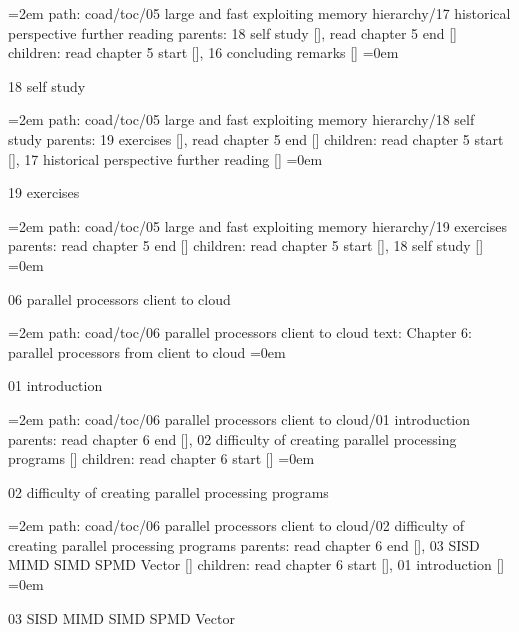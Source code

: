 \leftskip=2em
path: coad/toc/05 large and fast exploiting memory hierarchy/17 historical perspective further reading
\smallskip
parents:  18 self study [], read chapter 5 end []
\smallskip
children: read chapter 5 start [], 16 concluding remarks []
\smallskip
\leftskip=0em
\par\endgroup
\bigskip
{}
18 self study
\smallskip
\par\begingroup
\leftskip=2em
path: coad/toc/05 large and fast exploiting memory hierarchy/18 self study
\smallskip
parents:  19 exercises [], read chapter 5 end []
\smallskip
children: read chapter 5 start [], 17 historical perspective further reading []
\smallskip
\leftskip=0em
\par\endgroup
\bigskip
{}
19 exercises
\smallskip
\par\begingroup
\leftskip=2em
path: coad/toc/05 large and fast exploiting memory hierarchy/19 exercises
\smallskip
parents:  read chapter 5 end []
\smallskip
children: read chapter 5 start [], 18 self study []
\smallskip
\leftskip=0em
\par\endgroup
\bigskip
{}
06 parallel processors client to cloud
\smallskip
\par\begingroup
\leftskip=2em
path: coad/toc/06 parallel processors client to cloud
\smallskip
text:  Chapter 6: parallel processors from client to cloud
\smallskip
\leftskip=0em
\par\endgroup
\bigskip
{}
01 introduction
\smallskip
\par\begingroup
\leftskip=2em
path: coad/toc/06 parallel processors client to cloud/01 introduction
\smallskip
parents:  read chapter 6 end [], 02 difficulty of creating parallel processing programs []
\smallskip
children: read chapter 6 start []
\smallskip
\leftskip=0em
\par\endgroup
\bigskip
{}
02 difficulty of creating parallel processing programs
\smallskip
\par\begingroup
\leftskip=2em
path: coad/toc/06 parallel processors client to cloud/02 difficulty of creating parallel processing programs
\smallskip
parents:  read chapter 6 end [], 03 SISD MIMD SIMD SPMD Vector []
\smallskip
children: read chapter 6 start [], 01 introduction []
\smallskip
\leftskip=0em
\par\endgroup
\bigskip
{}
03 SISD MIMD SIMD SPMD Vector
